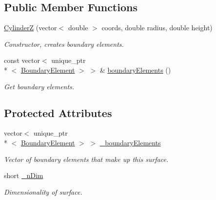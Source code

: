 \subsection*{Public Member Functions}
\begin{DoxyCompactItemize}
\item 
\hyperlink{classCylinderZ_addf4db65b61d99f5133e71778b5d3caf}{Cylinder\+Z} (vector$<$ double $>$ coords, double radius, double height)
\begin{DoxyCompactList}\small\item\em Constructor, creates boundary elements. \end{DoxyCompactList}\item 
const vector$<$ unique\+\_\+ptr\\*
$<$ \hyperlink{classBoundaryElement}{Boundary\+Element} $>$ $>$ \& \hyperlink{classBoundarySurface_a402dcf23f4f96110569d01e401edee5a}{boundary\+Elements} ()
\begin{DoxyCompactList}\small\item\em Get boundary elements. \end{DoxyCompactList}\end{DoxyCompactItemize}
\subsection*{Protected Attributes}
\begin{DoxyCompactItemize}
\item 
vector$<$ unique\+\_\+ptr\\*
$<$ \hyperlink{classBoundaryElement}{Boundary\+Element} $>$ $>$ \hyperlink{classBoundarySurface_a67f60b2d22fb67f097e98025803d3d34}{\+\_\+boundary\+Elements}
\begin{DoxyCompactList}\small\item\em Vector of boundary elements that make up this surface. \end{DoxyCompactList}\item 
short \hyperlink{classBoundarySurface_af3ed79310c6ba6cdc8e9f176bf463eb1}{\+\_\+n\+Dim}
\begin{DoxyCompactList}\small\item\em Dimensionality of surface. \end{DoxyCompactList}\end{DoxyCompactItemize}
